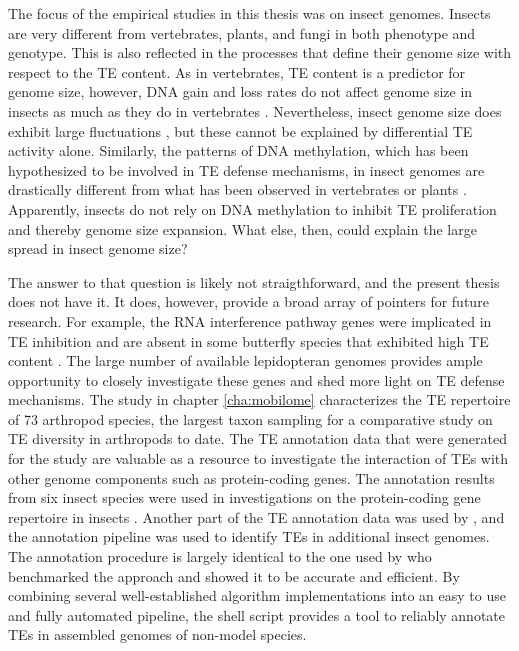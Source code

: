 The focus of the empirical studies in this thesis was on insect genomes.
Insects are very different from vertebrates, plants, and fungi in both
phenotype and genotype. This is also reflected in the processes that
define their genome size with respect to the TE content. As in
vertebrates, TE content is a predictor for genome size, however,  DNA
gain and loss rates do not affect genome size in insects as much as they
do in vertebrates \citep{Kapusta2017-1,Lindblad-Toh2005}.  Nevertheless,
insect genome size does exhibit large fluctuations \citep{Alfsnes2017},
but these cannot be explained by differential TE activity alone.
Similarly, the patterns of DNA methylation, which has been hypothesized
to be involved in TE defense mechanisms, in insect genomes are
drastically different from what has been observed in vertebrates or
plants \citep{Provataris2018,Suzuki2008}.  Apparently, insects do not
rely on DNA methylation to inhibit TE proliferation and thereby genome
size expansion. What else, then, could explain the large spread in
insect genome size?

The answer to that question is likely not straigthforward, and the
present thesis does not have it. It does, however, provide a broad array
of pointers for future research. For example, the RNA interference
pathway genes were implicated in TE inhibition
\citep{Aravin2001,Czech2008} and are absent in some butterfly species
that exhibited high TE content \citep{Dowling2017}. The large number of
available lepidopteran genomes provides ample opportunity to closely
investigate these genes and shed more light on TE defense mechanisms.
The study in chapter \ref{cha:mobilome} characterizes the TE repertoire
of 73 arthropod species, the largest taxon sampling for a comparative
study on TE diversity in arthropods to date. The TE annotation data that
were generated for the study are valuable as a resource to investigate
the interaction of TEs with other genome components such as
protein-coding genes. The annotation results from six insect species
 were used in investigations on the
protein-coding gene repertoire in insects .
Another part of the TE annotation data was used by
\citep{Provataris2018}, and the annotation pipeline was used to identify
TEs in additional insect genomes. The annotation procedure is largely
identical to the one used by \citet{Reinar2016} who benchmarked the
approach and showed it to be accurate and efficient. By combining
several well-established algorithm implementations into an easy to use
and fully automated pipeline, the shell script provides a tool to
reliably annotate TEs in assembled genomes of non-model species. 

